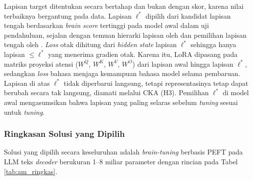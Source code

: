   Lapisan target ditentukan secara bertahap dan bukan dengan skor, karena nilai terbaiknya bergantung pada data. Lapisan $\ell^*$ dipilih dari kandidat lapisan tengah berdasarkan \textit{brain score} tertinggi pada model awal dalam uji pendahuluan, sejalan dengan temuan hierarki lapisan oleh \textcite{mischler2024contextual} dan pemilihan lapisan tengah oleh \textcite{xiao2026beyond}. \textit{Loss} otak dihitung dari \textit{hidden state} lapisan $\ell^*$ sehingga hanya lapisan $\le \ell^*$ yang menerima gradien otak. Karena itu, LoRA dipasang pada matriks proyeksi atensi ($W^Q$, $W^K$, $W^V$, $W^O$) dari lapisan awal hingga lapisan $\ell^*$, sedangkan \textit{loss} bahasa menjaga kemampuan bahasa model selama pembaruan. Lapisan di atas $\ell^*$ tidak diperbarui langsung, tetapi representasinya tetap dapat berubah secara tak langsung, diamati melalui CKA (H3). Pemilihan $\ell^*$ di model awal mengasumsikan bahwa lapisan yang paling selaras sebelum \textit{tuning}  sesuai untuk \textit{tuning}. %

  \subsubsection{Ringkasan Solusi yang Dipilih}

  Solusi yang dipilih secara keseluruhan adalah \textit{brain-tuning} berbasis PEFT pada LLM teks \textit{decoder} berukuran 1--8 miliar parameter dengan rincian pada Tabel \ref{tab:am_ringkas}.

